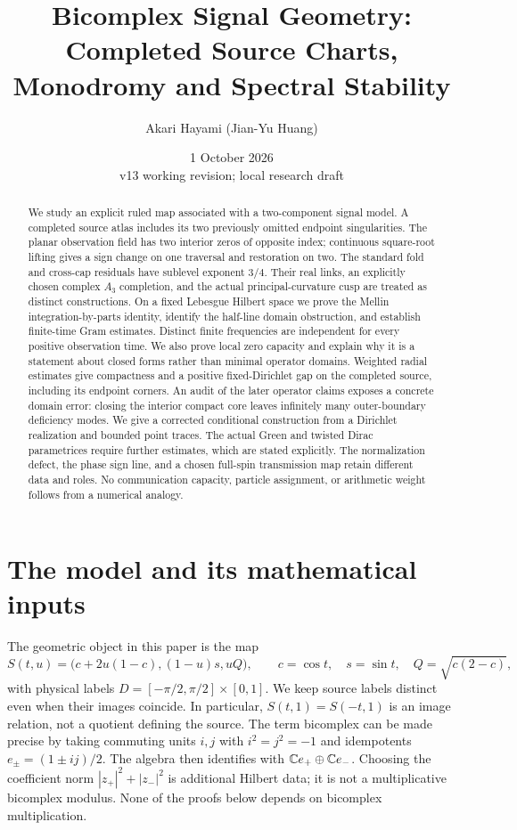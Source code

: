 \documentclass[11pt]{article}
\title{Bicomplex Signal Geometry:\\Completed Source Charts, Monodromy and Spectral Stability}
\author{Akari Hayami (Jian-Yu Huang)}
\date{1 October 2026\\\small v13 working revision; local research draft}
\theoremstyle{readable}
\theoremstyle{remark}\newtheorem{remark}[theorem]{Remark}
\begin{document}
\maketitle
\begin{abstract}
We study an explicit ruled map associated with a two-component signal model.
A completed source atlas includes its two previously omitted endpoint
singularities. The planar observation field has two interior zeros of opposite
index; continuous square-root lifting gives a sign change on one traversal and
restoration on two. The standard fold and cross-cap residuals have sublevel
exponent $3/4$. Their real links, an explicitly chosen complex $A_3$ completion,
and the actual principal-curvature cusp are treated as distinct constructions.
On a fixed Lebesgue Hilbert space we prove the Mellin integration-by-parts
identity, identify the half-line domain obstruction, and establish finite-time
Gram estimates. Distinct finite frequencies are independent for every positive
observation time. We also prove local zero capacity and explain why it is a
statement about closed forms rather than minimal operator domains.
Weighted radial estimates give compactness and a positive fixed-Dirichlet
gap on the completed source, including its endpoint corners.
An audit of the later operator claims exposes a concrete domain error:
closing the interior compact core leaves infinitely many outer-boundary
deficiency modes. We give a corrected conditional construction from a
Dirichlet realization and bounded point traces. The actual Green and twisted
Dirac parametrices require further estimates, which are stated explicitly.
The normalization defect, the phase sign line, and a chosen full-spin
transmission map retain different data and roles. No communication capacity,
particle assignment, or arithmetic weight follows from a numerical analogy.
\end{abstract}
\tableofcontents

\section{The model and its mathematical inputs}\label{sec:model}
The geometric object in this paper is the map
\begin{equation}\label{eq:S}
 S(t,u)=\bigl(c+2u(1-c),(1-u)s,uQ\bigr),\qquad
 c=\cos t,\quad s=\sin t,\quad Q=\sqrt{c(2-c)},
\end{equation}
with physical labels $D=[-\pi/2,\pi/2]\times[0,1]$.
We keep source labels distinct even when their images coincide. In particular,
$S(t,1)=S(-t,1)$ is an image relation, not a quotient defining the source.
The term bicomplex can be made precise by taking commuting units $i,j$ with
$i^2=j^2=-1$ and idempotents $e_\pm=(1\pm ij)/2$. The algebra then identifies
with $\mathbb C e_+\oplus\mathbb C e_-$. Choosing the coefficient norm
$|z_+|^2+|z_-|^2$ is additional Hilbert data; it is not a multiplicative
bicomplex modulus. None of the proofs below depends on bicomplex multiplication.
\end{document}
